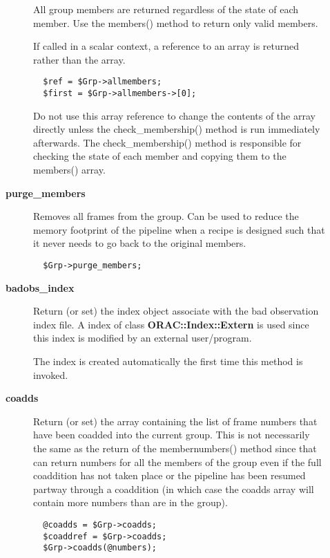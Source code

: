 \begin{description}
\begin{description}
All group members are returned regardless of the state of each member.
Use the members() method to return only valid members.



If called in a scalar context, a reference to an array is returned
rather than the array.

\begin{verbatim}
  $ref = $Grp->allmembers;
  $first = $Grp->allmembers->[0];
\end{verbatim}


Do not use this array reference to change the contents of the array
directly unless the check\_membership() method is run immediately
afterwards. The check\_membership() method is responsible for 
checking the state of each member and copying them to the members()
array.


\item[{\textbf{purge\_members}}] \mbox{}

Removes all frames from the group. Can be used to reduce the memory
footprint of the pipeline when a recipe is designed such that it never
needs to go back to the original members.

\begin{verbatim}
  $Grp->purge_members;
\end{verbatim}

\item[{\textbf{badobs\_index}}] \mbox{}

Return (or set) the index object associate with the bad observation
index file. A index of class \textbf{ORAC::Index::Extern} is used since 
this index is modified by an external user/program.



The index is created automatically the first time this method
is invoked.


\item[{\textbf{coadds}}] \mbox{}

Return (or set) the array containing the list of frame numbers that have
been coadded into the current group. This is not necessarily the same
as the return of the membernumbers() method since that can return numbers
for all the members of the group even if the full coaddition has not
taken place or the pipeline has been resumed partway through a coaddition
(in which case the coadds array will contain more numbers than are in the
group).

\begin{verbatim}
  @coadds = $Grp->coadds;
  $coaddref = $Grp->coadds;
  $Grp->coadds(@numbers);
\end{verbatim}



\end{description}
\end{description}
